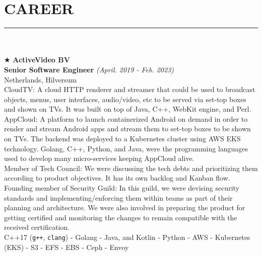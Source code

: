 \documentclass[10pt,a4paper]{article}
\begin{document}
\section{CAREER}
\noindent\rule {18.0cm}{0.2pt} \\ \\
$\bigstar$ \hspace{0.1cm} \large \textbf{ActiveVideo BV} \\
\indent \small \textbf{Senior Software Engineer} \textsl{(April. 2019 - Feb. 2023)} \\
\indent \textnormal{Netherlands, Hilversum} \\
\indent \textbullet \hspace{0.05cm} CloudTV: A cloud HTTP renderer and streamer that could be used to broadcast objects, menus, user interfaces, audio/video, etc to be served via set-top boxes and shown on TVs. It was built on top of Java, C++, WebKit engine, and Perl. \\
\indent \textbullet \hspace{0.05cm} AppCloud: A platform to launch containerized Android on demand in order to render and stream Android apps and stream them to set-top boxes to be shown on TVs. The backend was deployed to a Kubernetes cluster using AWS EKS technology. Golang, C++, Python, and Java, were the programming languages used to develop many micro-services keeping AppCloud alive. \\
\indent \textbullet \hspace{0.05cm} Member of Tech Council: We were discussing the tech debts and prioritizing them according to product objectives. It has its own backlog and Kanban flow. \\
\indent \textbullet \hspace{0.05cm} Founding member of Security Guild: In this guild, we were devising security standards and implementing/enforcing them within teams as part of their planning and architecture. We were also involved in preparing the product for getting certified and monitoring the changes to remain compatible with the received certification. \\
\indent \textbullet \hspace{0.05cm} C++17 (\texttt{g++}, \texttt{clang}) - Golang - Java, and Kotlin - Python - AWS - Kubernetes (EKS) - S3 - EFS - EBS - Ceph - Envoy \\

\break
\end{document}
